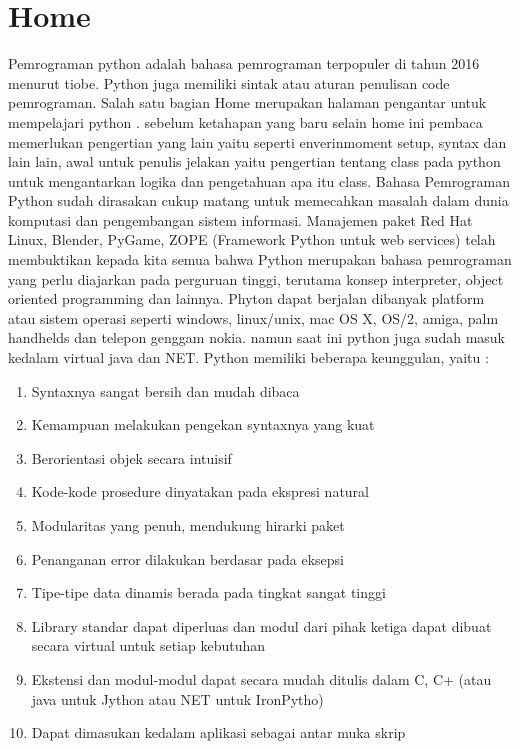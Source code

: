 \section{Home}
Pemrograman python adalah bahasa pemrograman terpopuler di tahun 2016 menurut tiobe. Python juga memiliki sintak atau aturan penulisan code pemrograman. Salah satu bagian Home merupakan halaman pengantar untuk mempelajari python . sebelum ketahapan yang baru selain home ini pembaca memerlukan pengertian yang lain yaitu seperti enverinmoment setup, syntax dan lain lain, awal untuk penulis jelakan yaitu pengertian tentang class pada python untuk mengantarkan logika dan pengetahuan apa itu class.
Bahasa Pemrograman Python sudah dirasakan cukup matang untuk memecahkan masalah dalam dunia komputasi dan pengembangan sistem informasi. Manajemen paket Red Hat Linux, Blender,  PyGame, ZOPE (Framework Python untuk web services) telah membuktikan kepada kita semua bahwa Python merupakan bahasa pemrograman yang perlu diajarkan pada perguruan tinggi, terutama konsep interpreter, object oriented programming dan lainnya.
Phyton dapat berjalan dibanyak platform atau sistem operasi seperti windows, linux/unix, mac OS X, OS/2, amiga, palm handhelds dan telepon genggam nokia. namun saat ini python juga sudah masuk kedalam virtual java dan NET. Python memiliki beberapa keunggulan, yaitu :
\begin{enumerate}
\item Syntaxnya sangat bersih dan mudah dibaca
\item Kemampuan melakukan pengekan syntaxnya yang kuat
\item Berorientasi objek secara intuisif
\item Kode-kode prosedure dinyatakan pada ekspresi natural
\item Modularitas yang penuh, mendukung hirarki paket
\item Penanganan error dilakukan berdasar pada eksepsi
\item Tipe-tipe data dinamis berada pada tingkat sangat tinggi
\item Library standar dapat diperluas dan modul dari pihak ketiga dapat dibuat secara virtual untuk setiap kebutuhan
\item Ekstensi dan modul-modul dapat secara mudah ditulis dalam C, C+ (atau java untuk Jython atau NET untuk IronPytho)
\item Dapat dimasukan kedalam aplikasi sebagai antar muka skrip
\end{enumerate}


